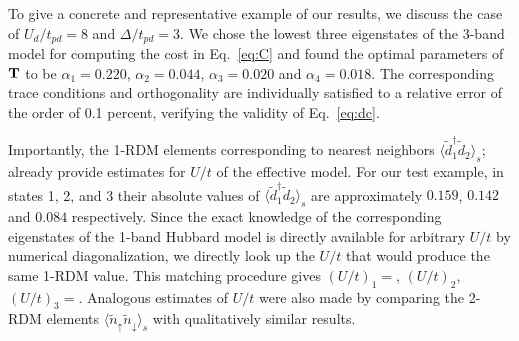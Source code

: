 To give a concrete and representative example of our results, we discuss the case of 
$U_d/t_{pd}=8$ and $\Delta/t_{pd}=3$. We chose the lowest three eigenstates of the 3-band model 
for computing the cost in Eq.~\ref{eq:C} and found the optimal parameters of 
${\bf T}$ to be $\alpha_1=0.220$, $\alpha_2=0.044$, $\alpha_3=0.020$ and $\alpha_4=0.018$. 
The corresponding trace conditions and orthogonality are individually 
satisfied to a relative error of the order of 0.1 percent, verifying 
the validity of Eq.~\ref{eq:dc}.

Importantly, the 1-RDM elements corresponding to nearest neighbors $\langle \tilde{d}_1^{\dagger} \tilde{d}_2 \rangle_s$; 
already provide estimates for $U/t$ of the effective model. 
For our test example, in states 1, 2, and 3 their absolute values of $\langle \tilde{d}_1^{\dagger} \tilde{d}_2 \rangle_s$ 
are approximately $0.159$, $0.142$ and $0.084$ respectively. Since the exact knowledge of the 
corresponding eigenstates of the 1-band Hubbard model is directly available for arbitrary 
$U/t$ by numerical diagonalization, we directly look up the $U/t$ that would produce the same 1-RDM value.
This matching procedure gives $(U/t)_1 = $, $(U/t)_2$, $(U/t)_3 = $. Analogous estimates of $U/t$ were 
also made by comparing the 2-RDM elements $\langle \tilde{n}_{\uparrow} \tilde{n}_{\downarrow} \rangle_s$ 
with qualitatively similar results. 

